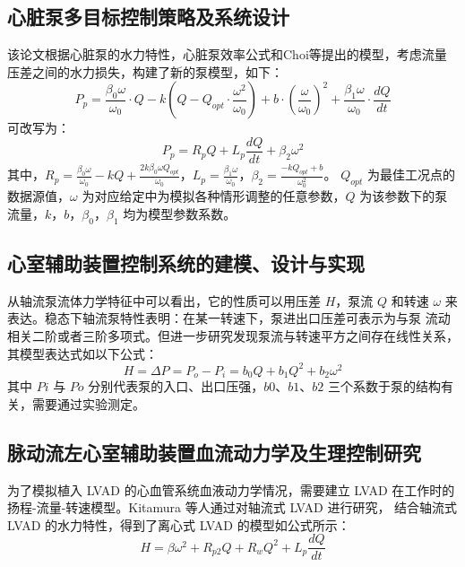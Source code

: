 \documentclass[titlepage,12pt]{article}
\begin{document}
\subsection{心脏泵多目标控制策略及系统设计}
该论文根据心脏泵的水力特性，心脏泵效率公式和Choi等提出的模型，考虑流量压差之间的水力损失，构建了新的泵模型，如下：
\begin{equation*}
    P_p = \frac{\beta_0 \omega}{\omega_0} \cdot Q - k(Q - Q_{opt} \cdot \frac{\omega^2}{\omega_0}) + b \cdot \left(\frac{\omega}{\omega_0}\right)^2 + \frac{\beta_1 \omega}{\omega_0} \cdot \frac{dQ}{dt}
\end{equation*}
可改写为：
\begin{equation*}
    P_p = R_p Q + L_p \frac{dQ}{dt} + \beta_2 \omega^2
\end{equation*}
其中，\(R_p = \frac{\beta_0 \omega}{\omega_0} - kQ + \frac{2k\beta_0 \omega Q_{opt}}{\omega_0}\)，\(L_p = \frac{\beta_1 \omega}{\omega_0}\)，\(\beta_2 = \frac{-kQ_{opt} + b}{\omega_0^2}\)。
\(Q_{opt}\) 为最佳工况点的数据源值，\(\omega\) 为对应给定中为模拟各种情形调整的任意参数，\(Q\) 为该参数下的泵流量，\(k\)，\(b\)，\(\beta_0\)，\(\beta_1\) 均为模型参数系数。

\subsection{心室辅助装置控制系统的建模、设计与实现}
从轴流泵流体力学特征中可以看出，它的性质可以用压差 $H$，泵流 $Q$ 和转速 $\omega$ 来表达。稳态下轴流泵特性表明：在某一转速下，泵进出口压差可表示为与泵  流动相关二阶或者三阶多项式。但进一步研究发现泵流与转速平方之间存在线性关系，其模型表达式如以下公式：
\begin{equation*}
    H = \Delta P = P_o - P_i = b_0 Q + b_1 Q^2 + b_2 \omega^2
\end{equation*}
其中 $Pi$ 与 $Po$ 分别代表泵的入口、出口压强，$b0$、$b1$、$b2$ 三个系数于泵的结构有关，需要通过实验测定。

\subsection{脉动流左心室辅助装置血流动力学及生理控制研究}
为了模拟植入 LVAD 的心血管系统血液动力学情况，需要建立 LVAD 在工作时的扬程-流量-转速模型。Kitamura 等人通过对轴流式 LVAD 进行研究，  结合轴流式 LVAD 的水力特性，得到了离心式 LVAD 的模型如公式所示：
\begin{equation*}
    H = \beta \omega^2 + R_{p2} Q + R_w Q^2 + L_p \frac{dQ}{dt}
\end{equation*}
\end{document}
